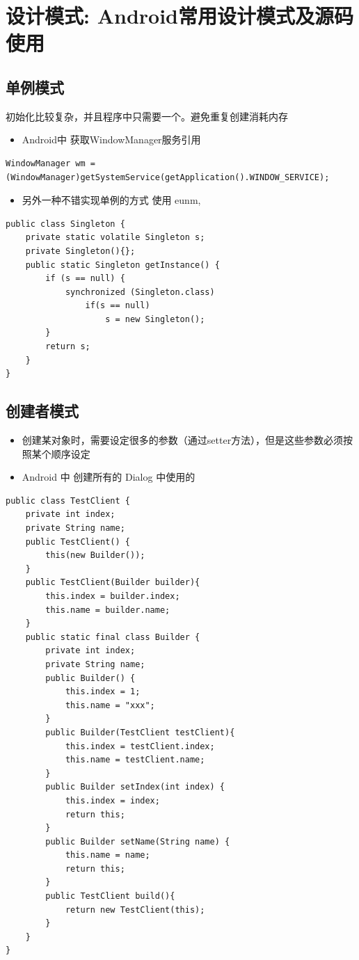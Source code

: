 \documentclass[9pt, b5paper]{article}
\begin{document}
\section{设计模式: Android常用设计模式及源码使用}
\label{sec-15}
\subsection{单例模式}
\label{sec-15-1}
初始化比较复杂，并且程序中只需要一个。避免重复创建消耗内存
\begin{itemize}
\item Android中 获取WindowManager服务引用
\end{itemize}
\begin{verbatim}
WindowManager wm = (WindowManager)getSystemService(getApplication().WINDOW_SERVICE);
\end{verbatim}
\begin{itemize}
\item 另外一种不错实现单例的方式 使用 eunm,
\end{itemize}
\begin{verbatim}
public class Singleton {
    private static volatile Singleton s;
    private Singleton(){};
    public static Singleton getInstance() {  
        if (s == null) {
            synchronized (Singleton.class) 
                if(s == null) 
                    s = new Singleton(); 
        }
        return s;
    }
}
\end{verbatim}
\subsection{创建者模式}
\label{sec-15-2}
\begin{itemize}
\item 创建某对象时，需要设定很多的参数（通过setter方法），但是这些参数必须按照某个顺序设定
\item Android 中 创建所有的 Dialog 中使用的
\end{itemize}
\begin{verbatim}
public class TestClient {
    private int index;
    private String name;
    public TestClient() {
        this(new Builder());
    }
    public TestClient(Builder builder){
        this.index = builder.index;
        this.name = builder.name;
    }
    public static final class Builder {
        private int index;
        private String name;
        public Builder() {
            this.index = 1;
            this.name = "xxx";
        }
        public Builder(TestClient testClient){
            this.index = testClient.index;
            this.name = testClient.name;
        }
        public Builder setIndex(int index) {
            this.index = index;
            return this;
        }
        public Builder setName(String name) {
            this.name = name;
            return this;
        }
        public TestClient build(){
            return new TestClient(this);
        }
    }
}
\end{verbatim}
\end{document}
